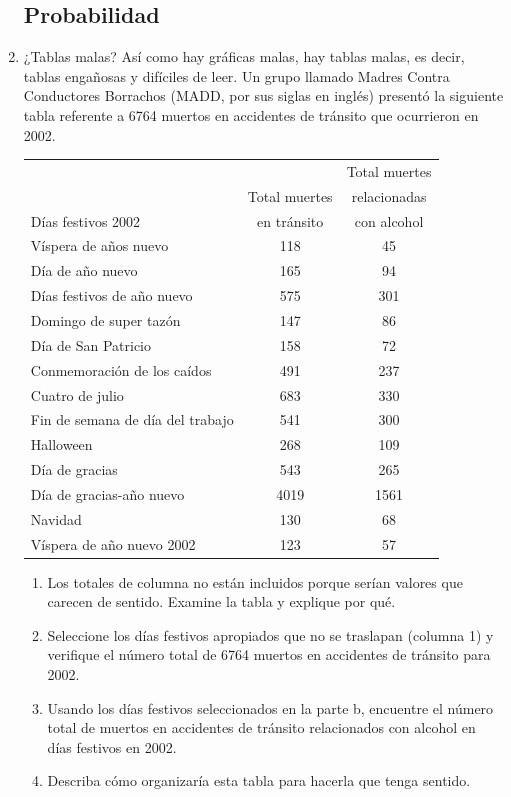 \documentclass[fleqn]{article}
\begin{document}
\begin{enumerate}
\subsection*{Probabilidad}
\item ¿Tablas malas? Así como hay gráficas malas, hay tablas malas, es decir, tablas engañosas y difíciles de leer. Un grupo llamado  Madres Contra Conductores Borrachos (MADD, por sus siglas en inglés) presentó la siguiente tabla referente a 6764 muertos en accidentes de tránsito que ocurrieron en 2002.
\newpage
\begin{center}
\begin{tabular}{lcc}
 &  & Total muertes \\ 
 & Total muertes & relacionadas \\ 
\hspace{15pt} Días festivos 2002 & en tránsito & con alcohol \\ 
\hline 
Víspera de años nuevo & 118 & 45 \\ 
Día de año nuevo & 165 & 94 \\ 
Días festivos de año nuevo & 575 & 301 \\ 
Domingo de super tazón & 147 & 86 \\ 
Día de San Patricio & 158 & 72 \\ 
Conmemoración de los caídos & 491 & 237 \\ 
Cuatro de julio & 683 & 330 \\ 
Fin de semana de día del trabajo & 541 & 300 \\ 
Halloween & 268 & 109 \\ 
Día de gracias & 543 & 265 \\ 
Día de gracias-año nuevo & 4019 & 1561 \\ 
Navidad & 130 & 68 \\ 
Víspera de año nuevo 2002 & 123 & 57 \\ 
\hline 
\end{tabular}
\end{center}
\begin{enumerate}
\item Los totales de columna no están incluidos porque
serían valores que carecen de sentido. Examine la
tabla y explique por qué.\noanswer
\item Seleccione los días festivos apropiados que no se
traslapan (columna 1) y verifique el número total
de 6764 muertos en accidentes de tránsito para
2002.\noanswer
\item Usando los días festivos seleccionados en la parte b, encuentre el número total de muertos en accidentes de tránsito relacionados con alcohol en
días festivos en 2002.\noanswer
\item Describa cómo organizaría esta tabla para hacerla que tenga sentido.\noanswer
\end{enumerate}
\end{enumerate}
\end{document}
